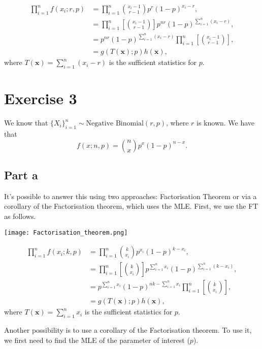 \documentclass[12pt]{article}
\begin{document}
\begin{align}
\prod_{i=1}^{n} f(x_{i}; r, p) & = \prod_{i=1}^{n} {x_{i}-1 \choose r - 1}p^{r} (1-p)^{x_{i}-r}, \\
& = \prod_{i=1}^{n} \left[ {x_{i}-1 \choose r - 1} \right] p^{n r} (1-p)^{\sum_{i=1}^{n} (x_{i}-r)}, \\
& = p^{n r} (1-p)^{\sum_{i=1}^{n} (x_{i}-r)} \prod_{i=1}^{n} \left[ {x_{i}-1 \choose r - 1} \right], \\
& = g(T(\textbf{x}); p) h(\textbf{x}),
\end{align}
where $T(\textbf{x}) = \sum_{i=1}^{n} (x_{i}-r)$ is the sufficient statistics for $p$.

\section*{Exercise 3}

We know that $\{X_{i}\}_{i=1}^{n} \sim \mbox{Negative Binomial}(r, p)$, where $r$ is known. We have that
\begin{equation}
f(x; n, p) = {n \choose x}p^{x} (1-p)^{n-x}.
\end{equation}

\subsection*{Part a}
It's possible to answer this using two approaches: Factorisation Theorem or via a corollary of the Factorisation theorem, which uses the MLE. First, we use the FT as follows.

\texttt{[image: Factorisation\_theorem.png]}

\begin{align}
\prod_{i=1}^{n} f(x_{i}; k, p) & = \prod_{i=1}^{n} {k \choose x_{i}}p^{x_{i}} (1-p)^{k-x_{i}}, \\
& = \prod_{i=1}^{n} \left[ {k \choose x_{i}} \right] p^{ \sum_{i=1}^{n} x_{i}} (1-p)^{\sum_{i=1}^{n} (k-x_{i})}, \\
& = p^{\sum_{i=1}^{n} x_{i}} (1-p)^{ nk- \sum_{i=1}^{n}x_{i}} \prod_{i=1}^{n} \left[ {k \choose x_{i}} \right], \\
& = g(T(\textbf{x}); p) h(\textbf{x}),
\end{align}
where $T(\textbf{x}) = \sum_{i=1}^{n} x_{i}$ is the sufficient statistics for $p$.

Another possibility is to use a corollary of the Factorisation theorem. To use it, we first need to find the MLE of the parameter of interest ($p$). 
\end{document}
